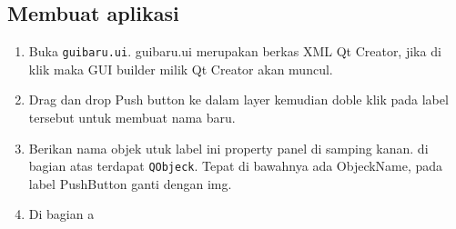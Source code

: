\subsection{Membuat aplikasi}

\begin{enumerate}
	\item Buka \texttt{guibaru.ui}. guibaru.ui merupakan berkas XML Qt Creator, jika di klik maka GUI builder milik Qt Creator akan muncul.
	\item Drag dan drop Push button ke dalam layer kemudian doble klik pada label tersebut untuk membuat nama baru.
	
	
	\item Berikan nama objek utuk label ini property panel di samping kanan. di bagian atas terdapat \texttt{QObjeck}. Tepat di bawahnya ada ObjeckName, pada label PushButton ganti dengan img.
	
	
	\item Di bagian a
	
\end{enumerate}